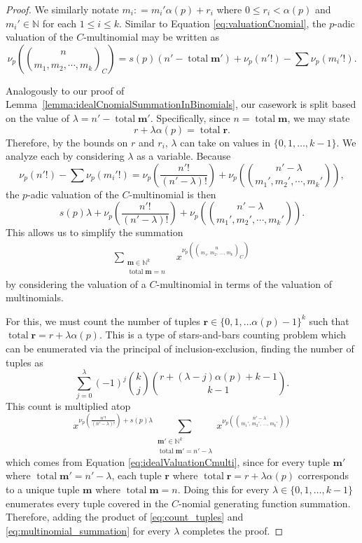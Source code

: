 \documentclass{amsart}
\theoremstyle{definition}
\DeclareMathOperator{\total}{total}
\newcommand{\N}{\mathbb{N}}
\newcommand{\colonequal}{\mathrel{\mathop:}=}
\begin{document}
\begin{proof}

We similarly notate $m_i\colonequal m_i'\alpha(p)+r_i$ where $ 0 \leq r_i < \alpha(p) $ and $ m_i' \in \N $ for each $1\leq i\leq k$.  Similar to Equation \eqref{eq:valuationCnomial}, the $p$-adic valuation of the $C$-multinomial may be written as $$\nu_p\!\left(\binom{n}{m_1, m_2, \cdots,m_k}_C\right)=s(p)\left(n'-\total \mathbf{m'}\right)+\nu_p(n'!)-\sum\nu_p(m_i'!).$$ 

Analogously to our proof of Lemma~\ref{lemma:idealCnomialSummationInBinomials}, our casework is split based on the value of $\lambda=n'-\total \mathbf{m'}$. Specifically, since $n=\total \mathbf{m}$, we may state
$$r+\lambda\alpha(p)=\total \mathbf{r}.$$ 
Therefore, by the bounds on $r$ and $r_i$, $\lambda$ can take on values in $\{0,1,\ldots,k-1\}$. We analyze each by considering $\lambda$ as a variable. 
Because $$\nu_p(n'!)-\sum\nu_p(m_i'!)=\nu_p\!\left(\frac{n'!}{(n'-\lambda)!}\right) + \nu_p\!\left(\binom{n'-\lambda}{m_1', m_2', \cdots,m_k'}\right),$$ the $p$-adic valuation of the $C$-multinomial is then \begin{equation}\label{eq:idealValuationCmulti}
s(p)\lambda+\nu_p\!\left(\frac{n'!}{(n'-\lambda)!}\right) + \nu_p\!\left(\binom{n'-\lambda}{m_1', m_2', \cdots,m_k'}\right).    
\end{equation}
This allows us to simplify the summation 
\begin{align*}
\sum_{\substack{\mathbf{m}\in\N^k \\ \total\mathbf{m}= n}} & x^{\nu_p\!\left(\binom{n}{m_1,\, m_2,\, \dots,\, m_k}_C\right)} 
\end{align*}
by considering the valuation of a $C$-multinomial in terms of the valuation of multinomials.

For this, we must count the number of tuples $\mathbf{r}\in\{0, 1, \ldots \alpha(p)-1\}^k$ such that $\total \mathbf{r}=r+\lambda\alpha(p)$. This is a type of stars-and-bars counting problem which can be enumerated via the principal of inclusion-exclusion, finding the number of tuples as 
\begin{equation} \label{eq:count_tuples}
\sum_{j=0}^{\lambda}(-1)^j\binom{k}{j}\binom{r+(\lambda-j)\alpha(p)+k-1}{k-1}.
\end{equation}
This count is multiplied atop 
\begin{equation} \label{eq:multinomial_summation}
x^{\nu_p\!\left(\frac{n'!}{(n'-\lambda)!}\right)+ s(p)\lambda}\sum_{\substack{\mathbf{m'}\in\N^k \\ \total\mathbf{m'}= n'-\lambda}} x^{\nu_p(\binom{n'-\lambda}{m_1',\, m_2',\, \dots,\, m_k'})}    
\end{equation}
which comes from Equation \eqref{eq:idealValuationCmulti}, since for every tuple $\mathbf{m'}$ where $\total\mathbf{m'}=n'-\lambda$, each tuple $\mathbf{r}$ where $\total\mathbf{r}=r+\lambda\alpha(p)$ corresponds to a unique tuple $\mathbf{m}$ where $\total\mathbf{m} = n$. 
Doing this for every $\lambda\in\{0, 1,\ldots,k-1\}$ enumerates every tuple covered in the $C$-nomial generating function summation. Therefore, adding the product of \eqref{eq:count_tuples} and \eqref{eq:multinomial_summation} for every $\lambda$ completes the proof.
\end{proof}
\end{document}
